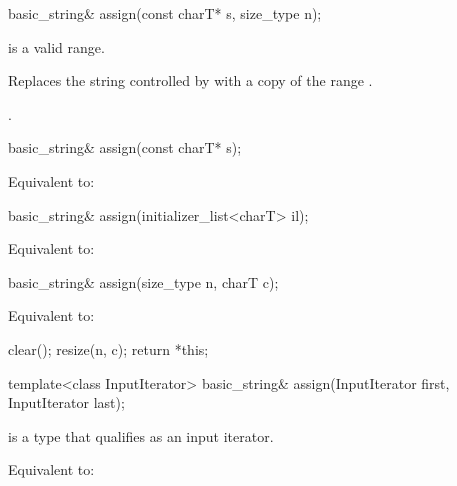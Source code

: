 %
\begin{itemdecl}
basic_string& assign(const charT* s, size_type n);
\end{itemdecl}

\begin{itemdescr}
\pnum
\expects {} is a valid range.

\pnum
\effects
Replaces the string controlled by  with
a copy of the range .

\pnum
\returns
{}.
\end{itemdescr}

%
\begin{itemdecl}
basic_string& assign(const charT* s);
\end{itemdecl}

\begin{itemdescr}
\pnum
\effects Equivalent to: 
\end{itemdescr}

%
\begin{itemdecl}
basic_string& assign(initializer_list<charT> il);
\end{itemdecl}

\begin{itemdescr}
\pnum
\effects Equivalent to: 
\end{itemdescr}

%
\begin{itemdecl}
basic_string& assign(size_type n, charT c);
\end{itemdecl}

\begin{itemdescr}
\pnum
\effects Equivalent to:
\begin{codeblock}
clear();
resize(n, c);
return *this;
\end{codeblock}
\end{itemdescr}

%
\begin{itemdecl}
template<class InputIterator>
  basic_string& assign(InputIterator first, InputIterator last);
\end{itemdecl}

\begin{itemdescr}
\pnum
\constraints
{} is a type that qualifies as an input
iterator.

\pnum
\effects Equivalent to: 
\end{itemdescr}

